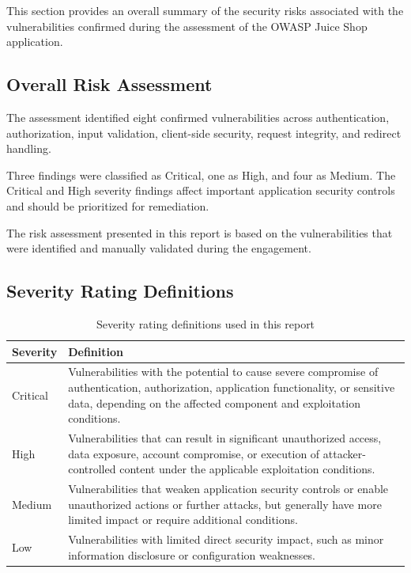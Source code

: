 This section provides an overall summary of the security risks
associated with the vulnerabilities confirmed during the assessment
of the OWASP Juice Shop application.

\subsection*{Overall Risk Assessment}

The assessment identified eight confirmed vulnerabilities across
authentication, authorization, input validation, client-side security,
request integrity, and redirect handling.

Three findings were classified as Critical, one as High, and four as
Medium. The Critical and High severity findings affect important
application security controls and should be prioritized for
remediation.

The risk assessment presented in this report is based on the
vulnerabilities that were identified and manually validated during
the engagement.

\subsection*{Severity Rating Definitions}

\begin{table}[H]
\centering
\renewcommand{\arraystretch}{1.3}
\begin{tabular}{|l|p{10cm}|}
\hline
\textbf{Severity} & \textbf{Definition} \\
\hline
Critical &
Vulnerabilities with the potential to cause severe compromise of
authentication, authorization, application functionality, or
sensitive data, depending on the affected component and exploitation
conditions. \\
\hline
High &
Vulnerabilities that can result in significant unauthorized access,
data exposure, account compromise, or execution of attacker-controlled
content under the applicable exploitation conditions. \\
\hline
Medium &
Vulnerabilities that weaken application security controls or enable
unauthorized actions or further attacks, but generally have more
limited impact or require additional conditions. \\
\hline
Low &
Vulnerabilities with limited direct security impact, such as minor
information disclosure or configuration weaknesses. \\
\hline
\end{tabular}
\caption{Severity rating definitions used in this report}
\end{table}

